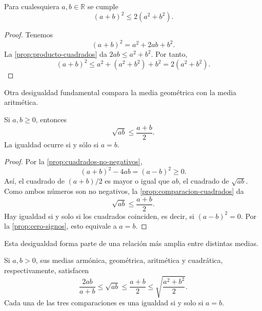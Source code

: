 \begin{samepage}
\begin{proposition}
\label{prop:cuadrado-suma}
Para cualesquiera $a,b\in\mathbb{R}$ se cumple
\[
(a+b)^2\leq2(a^2+b^2).
\]
\end{proposition}
\end{samepage}

\begin{proof}
Tenemos
\[
(a+b)^2=a^2+2ab+b^2.
\]
La \cref{prop:producto-cuadrados} da $2ab\leq a^2+b^2$. Por tanto,
\[
(a+b)^2
\leq
a^2+(a^2+b^2)+b^2
=
2(a^2+b^2).
\]
\end{proof}

Otra desigualdad fundamental compara la media geométrica con la media aritmética.

\begin{samepage}
\begin{proposition}
\label{prop:media-geometrica}
Si $a,b\geq0$, entonces
\[
\sqrt{ab}\leq\frac{a+b}{2}.
\]
La igualdad ocurre si y sólo si $a=b$.
\end{proposition}
\end{samepage}

\begin{proof}
Por la \cref{prop:cuadrados-no-negativos},
\[
(a+b)^2-4ab=(a-b)^2\geq0.
\]
Así, el cuadrado de $(a+b)/2$ es mayor o igual que $ab$, el cuadrado de $\sqrt{ab}$. Como ambos números son no negativos, la \cref{prop:comparacion-cuadrados} da
\[
\sqrt{ab}\leq\frac{a+b}{2}.
\]
Hay igualdad si y solo si los cuadrados coinciden, es decir, si $(a-b)^2=0$. Por la \cref{prop:cero-signos}, esto equivale a $a=b$.
\end{proof}

Esta desigualdad forma parte de una relación más amplia entre distintas medias.

\begin{samepage}
\begin{proposition}
\label{prop:medias}
Si $a,b>0$, sus medias armónica, geométrica, aritmética y cuadrática, respectivamente, satisfacen
\[
\frac{2ab}{a+b}
\leq
\sqrt{ab}
\leq
\frac{a+b}{2}
\leq
\sqrt{\frac{a^2+b^2}{2}}.
\]
Cada una de las tres comparaciones es una igualdad si y solo si $a=b$.
\end{proposition}
\end{samepage}

